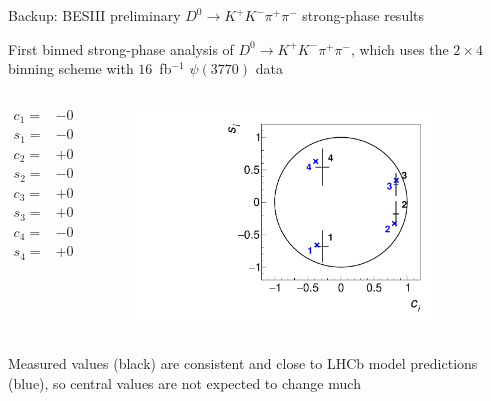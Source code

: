 \documentclass[xcolor={dvipsnames}]{beamer}
\begin{document}
\begin{frame}{Backup: BESIII preliminary $D^0\to K^+K^-\pi^+\pi^-$ strong-phase results}
  \begin{center}
    First binned strong-phase analysis of $D^0\to K^+K^-\pi^+\pi^-$, which uses the $2\times4$ binning scheme with $16$~fb$^{-1}$ $\psi(3770)$ data
  \end{center}
  \vspace{-0.3cm}
  \begin{columns}
    \begin{column}{0.5\textwidth}
      \vspace{-0.5cm}
      \begin{align*}
        c_1 =& -0.28 \pm 0.09 \pm 0.01 \\
        s_1 =& -0.68 \pm 0.24 \pm 0.04 \\
        c_2 =& +0.83 \pm 0.04 \pm 0.01 \\
        s_2 =& -0.18 \pm 0.19 \pm 0.03 \\
        c_3 =& +0.83 \pm 0.03 \pm 0.01 \\
        s_3 =& +0.27 \pm 0.17 \pm 0.03 \\
        c_4 =& -0.28 \pm 0.10 \pm 0.01 \\
        s_4 =& +0.54 \pm 0.28 \pm 0.04
      \end{align*}
    \end{column}
    \begin{column}{0.5\textwidth}
      \begin{figure}
        \centering
        \includegraphics[width=0.9\textwidth]{Plots/cisi_FitResults_Model.pdf}
      \end{figure}
    \end{column}
  \end{columns}
  \begin{center}
    Measured values (black) are consistent and close to LHCb model predictions (blue), so central values are not expected to change much
  \end{center}
\end{frame}
\end{document}
